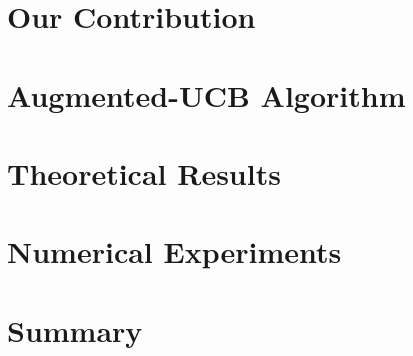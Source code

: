 \documentclass[MS,twoside]{iitmdiss}
\begin{document}
\section{Our Contribution}
\label{tbandit:contribution}



\section{Augmented-UCB Algorithm}
\label{tbandit:algorithm}



\section{Theoretical Results}
\label{tbandit:results}



\section{Numerical Experiments}
\label{tbandit:expt}



\section{Summary}
\label{tbandit:conclusion}



\end{document}
